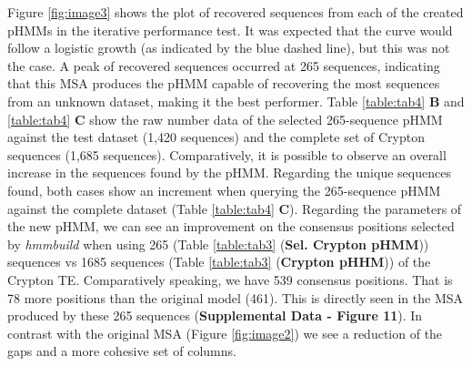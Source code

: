 \documentclass[unnumsec,webpdf,contemporary,large]{oup-authoring-template}%
\theoremstyle{thmstyleone}%
\theoremstyle{thmstyletwo}%
\theoremstyle{thmstylethree}%
\begin{document}
Figure \ref{fig:image3} shows the plot of recovered sequences from each of the created pHMMs in the iterative performance test. It was expected that the curve would follow a logistic growth (as indicated by the blue dashed line), but this was not the case. A peak of recovered sequences occurred at 265 sequences, indicating that this MSA produces the pHMM capable of recovering the most sequences from an unknown dataset, making it the best performer. Table \ref{table:tab4} \textbf{B} and \ref{table:tab4} \textbf{C} show the raw number data of the selected 265-sequence pHMM against the test dataset (1,420 sequences) and the complete set of Crypton sequences (1,685 sequences). Comparatively, it is possible to observe an overall increase in the sequences found by the pHMM. Regarding the unique sequences found, both cases show an increment when querying the 265-sequence pHMM against the complete dataset (Table \ref{table:tab4} \textbf{C}). Regarding the parameters of the new pHMM, we can see an improvement on the consensus positions selected by \textit{hmmbuild} when using 265 (Table \ref{table:tab3} (\textbf{Sel. Crypton pHMM})) sequences vs 1685 sequences (Table \ref{table:tab3} (\textbf{Crypton pHHM})) of the Crypton TE. Comparatively speaking, we have 539 consensus positions. That is 78 more positions than the original model (461). This is directly seen in the MSA produced by these 265 sequences (\textbf{Supplemental Data - Figure 11}). In contrast with the original MSA (Figure \ref{fig:image2}) we see a reduction of the gaps and a more cohesive set of columns.
\end{document}

